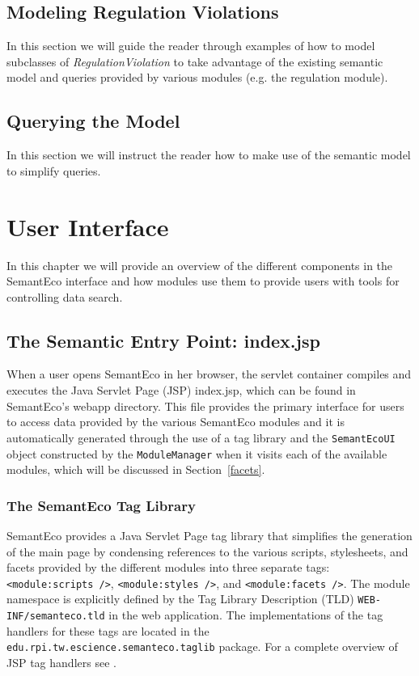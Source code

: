 \documentclass[letterpaper]{report}
\begin{document}
\section{Modeling Regulation Violations}
\label{regulation-violation}
In this section we will guide the reader through examples of how to model subclasses of \textit{RegulationViolation} to take advantage of the existing semantic model and queries provided by various modules (e.g. the regulation module).
\section{Querying the Model}
\label{querying}
In this section we will instruct the reader how to make use of the semantic model to simplify queries.


\chapter{User Interface}
\label{user-interface}
In this chapter we will provide an overview of the different components in the SemantEco interface and how modules use them to provide users with tools for controlling data search.

\section{The Semantic Entry Point: index.jsp}
\label{index.jsp}
When a user opens SemantEco in her browser, the servlet container compiles and executes the Java Servlet Page (JSP) index.jsp, which can be found in SemantEco's webapp directory. This file provides the primary interface for users to access data provided by the various SemantEco modules and it is automatically generated through the use of a tag library and the \texttt{SemantEcoUI} object constructed by the \texttt{ModuleManager} when it visits each of the available modules, which will be discussed in Section~\ref{facets}.

\subsection{The SemantEco Tag Library}
\label{tag-library}
SemantEco provides a Java Servlet Page tag library that simplifies the generation of the main page by condensing references to the various scripts, stylesheets, and facets provided by the different modules into three separate tags: \texttt{<module:scripts />}, \texttt{<module:styles />}, and \texttt{<module:facets />}. The module namespace is explicitly defined by the Tag Library Description (TLD) \texttt{WEB-INF/semanteco.tld} in the web application. The implementations of the tag handlers for these tags are located in the \\\texttt{edu.rpi.tw.escience.semanteco.taglib} package. For a complete overview of JSP tag handlers see \cite{JSPTagHandlers}.
\end{document}
